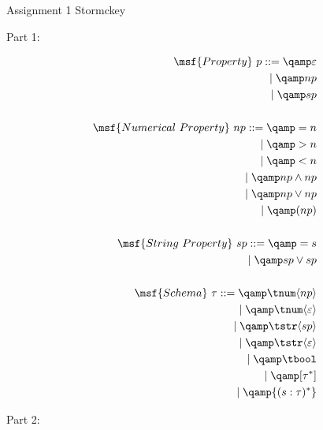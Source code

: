 \documentclass[11pt]{article}
\newcommand{\prop}[1]{\langle{#1}\rangle}%
\begin{document}
\hwtitle
  {Assignment 1}
  {Stormckey} %


Part 1:

\begin{alignat*}{1}
\msf{Property}~p ::= \qamp \varepsilon \\
\mid \qamp np \\
\mid \qamp sp \\
\\
\msf{Numerical\ Property}~np ::= \qamp = n \\
\mid \qamp > n \\
\mid \qamp < n \\
\mid \qamp np \wedge np \\
\mid \qamp np \vee np \\
\mid \qamp (np) \\
\\
\msf{String\ Property}~sp ::= \qamp = s \\
\mid \qamp sp \vee sp \\
\\
\msf{Schema}~\tau ::= \qamp \tnum \prop{np} \\
\mid \qamp \tnum \prop{\varepsilon} \\
\mid \qamp \tstr \prop{sp} \\
\mid \qamp \tstr \prop{\varepsilon} \\
\mid \qamp \tbool \\
\mid \qamp [\tau^*] \\
\mid \qamp \{(s:\tau)^*\} \\
\end{alignat*}

Part 2:
\end{document}

